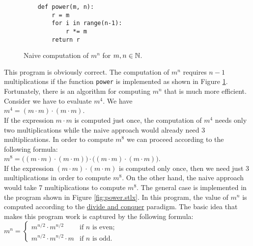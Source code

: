 \begin{figure}[!h]
  \centering
\begin{verbatim}
    def power(m, n):
        r = m
        for i in range(n-1):
            r *= m
        return r
\end{verbatim}
\vspace*{-0.3cm}
  \caption{Naive computation of $m^n$ for  $m,n \in {\mathbb N}$.}
  \label{fig:power-naive.stlx}
\end{figure} 

This program is obviously correct.  The computation of $m^n$ requires $n-1$ multiplications if the
function \texttt{power}  is implemented as shown in Figure \ref{fig:power-naive.stlx}.
Fortunately, there is an algorithm for computing $m^n$ that is much more efficient.
Consider we have to evaluate $m^4$.  We have
 \\[0.2cm]
\hspace*{1.3cm} 
$m^4 = (m \cdot m) \cdot (m \cdot m)$.
\\[0.2cm]
If the expression $m\cdot m$ is computed just once, the computation of
$m^4$ needs only two multiplications while the naive approach would already need 3 multiplications.
In order to compute $m^8$ we can proceed according to the following formula: \\[0.2cm]
\hspace*{1.3cm} 
$m^8 = \bigl( (m \cdot m) \cdot (m \cdot m) \bigr) \cdot \bigl( (m \cdot m) \cdot (m \cdot m)
\bigr)$. 
\\[0.2cm]
If the expression $(m \cdot m) \cdot (m \cdot m)$ is computed only once, then we need just 3 multiplications
in order to compute $m^8$.   On the other hand, the naive approach would take 7 multiplications to
compute $m^8$.  The general case is implemented in the program shown in Figure \ref{fig:power.stlx}.  
In this program, the value of $m^n$ is computed according to the 
\href{http://en.wikipedia.org/wiki/Divide_and_conquer_algorithm}{divide and conquer} paradigm.
The basic idea that makes this program work is captured by the following formula: 
\\[0.2cm] 
\hspace*{1.3cm} 
$m^n = 
\left\{\begin{array}{ll}
m^{n/2} \cdot m^{n/2}          & \mbox{if $n$ is even};    \\
m^{n/2} \cdot m^{n/2} \cdot m  & \mbox{if $n$ is odd}.
\end{array}
\right.
$
\vspace*{0.3cm}

